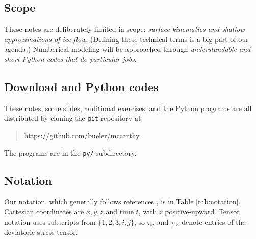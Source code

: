 \documentclass[letterpaper,final,12pt,reqno]{amsart}
\begin{document}
\subsection*{Scope}  These notes are deliberately limited in scope: \emph{surface kinematics and shallow approximations of ice flow}.  (Defining these technical terms is a big part of our agenda.)  Numberical modeling will be approached through \emph{understandable and short Python codes that do particular jobs}.

\subsection*{Download and Python codes}  These notes, some slides, additional exercises, and  the Python programs are all distributed by cloning the \texttt{git} repository at
\begin{quote}
\url{https://github.com/bueler/mccarthy}
\end{quote}
\noindent The programs are in the \texttt{py/} subdirectory.

\subsection*{Notation}  Our notation, which generally follows references \cite{GreveBlatter2009,SchoofHewitt2013}, is in Table \ref{tab:notation}.  Cartesian coordinates are $x,y,z$ and time $t$, with $z$ positive-upward.  Tensor notation uses subscripts from $\{1,2,3,i,j\}$, so $\tau_{ij}$ and $\tau_{13}$ denote entries of the deviatoric stress tensor.
\end{document}

